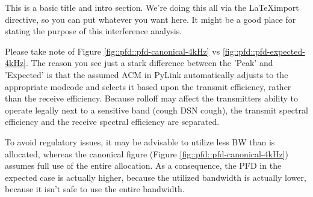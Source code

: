 
This is a basic title and intro section.  We're doing this all via the
\LaTeX import directive, so you can put whatever you want here.  It
might be a good place for stating the purpose of this interference
analysis.

\newpage

Please take note of Figure \ref{fig::pfd::pfd-canonical-4kHz} vs
\ref{fig::pfd::pfd-expected-4kHz}.  The reason you see just a stark
difference between the 'Peak' and 'Expected' is that the assumed ACM
in PyLink automatically adjusts to the appropriate modcode and selects
it based upon the transmit efficiency, rather than the receive
efficiency.  Because rolloff may affect the transmitters ability to
operate legally next to a sensitive band (cough DSN cough), the
transmit spectral efficiency and the receive spectral efficiency are
separated.

To avoid regulatory issues, it may be advisable to utilize less BW
than is allocated, whereas the canonical figure (Figure
\ref{fig::pfd::pfd-canonical-4kHz}) assumes full use of the entire
allocation.  As a consequence, the PFD in the expected case is
actually higher, because the utilized bandwidth is actually lower,
because it isn't safe to use the entire bandwidth.
